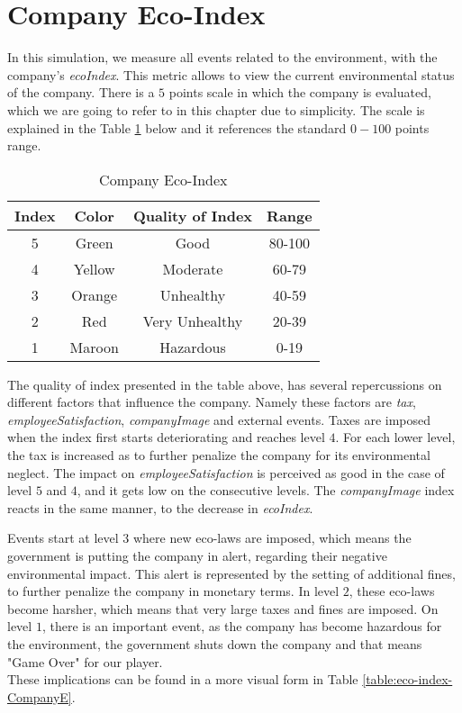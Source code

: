 \section{Company Eco-Index}
\label{sec:compEco-idex}
In this simulation, we measure all events related to the environment, with the company's \textit{ecoIndex}. This metric allows to view the current environmental status of the company. There is a $5$ points scale in which the company is evaluated, which we are going to refer to in this chapter due to simplicity. The scale is explained in the Table \ref{table:eco-index-Company} below and it references the standard $0-100$ points range. \\


\begin{table}[ht]
\centering
\begin{tabular}{|c|c|c|c|}
\hline
 Index & Color & Quality of Index & Range \\
\hline
 5 & \cellcolor[HTML]{228b22}Green & Good & 80-100\\ \hline
 4 & \cellcolor[HTML]{ffff00}Yellow & Moderate & 60-79\\  \hline
 3 & \cellcolor[HTML]{ffd700}Orange & Unhealthy & 40-59\\ \hline
 2 & \cellcolor[HTML]{ff0000}Red & Very Unhealthy & 20-39 \\ \hline
 1 & \cellcolor[HTML]{a52a2a}Maroon & Hazardous & 0-19\\
\hline
\end{tabular}
\caption{Company Eco-Index}
\label{table:eco-index-Company}
\end{table}

The quality of index presented in the table above, has several repercussions on different factors that influence the company. Namely these factors are \textit{tax}, \textit{employeeSatisfaction}, \textit{companyImage} and external events. Taxes are imposed when the index first starts deteriorating and reaches level $4$. For each lower level, the tax is increased as to further penalize the company for its environmental neglect. The impact on \textit{employeeSatisfaction} is perceived as good in the case of level $5$ and $4$, and it gets low on the consecutive levels. The \textit{companyImage} index reacts in the same manner, to the decrease in \textit{ecoIndex}.

Events start at level $3$ where new eco-laws are imposed, which means the government is putting the company in alert, regarding their negative environmental impact. This alert is represented by the setting of additional fines, to further penalize the company in monetary terms. In level $2$, these eco-laws become harsher, which means that very large taxes and fines are imposed. On level $1$, there is an important event, as the company has become hazardous for the environment, the government shuts down the company and that means "Game Over" for our player. \\
 These implications can be found in a more visual form in Table \ref{table:eco-index-CompanyE}.

